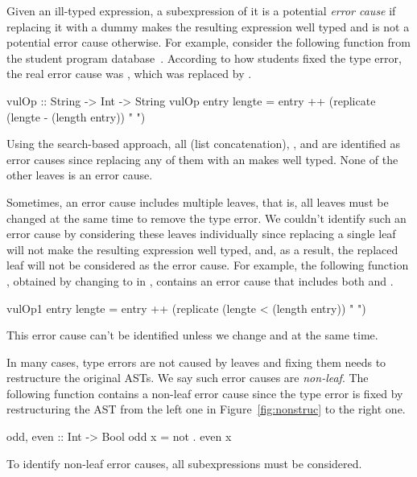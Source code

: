 \documentclass[12pt]{report}	%
\begin{document}
Given an ill-typed expression, a subexpression of
it is a potential \emph{error cause} if
replacing it with a dummy makes the resulting
expression well typed and is not a potential error
cause otherwise.
For example, consider the following function
 from the student program
database~\cite{Heliumbp}. According to how students fixed
the type error, the real error cause was ,
which was replaced by \progsq{ }.
%
\begin{program}
vulOp :: String -> Int -> String
vulOp entry lengte = entry ++ (replicate (lengte - (length entry)) " ")
\end{program}
%
%
%
Using the search-based approach, all \prog{(++)} (list concatenation),
, and  are identified as error causes since
replacing any of them with an  makes 
well typed. None of the other leaves is an error cause.

Sometimes, an error cause includes
multiple leaves, that is, all leaves must be changed at the
same time to remove the type error.
We couldn't identify such an error cause by
considering these leaves individually since replacing a single
leaf will not make the resulting expression well typed, and,
as a result, the replaced leaf will not be considered as
the error cause.
%
For example, the following function , obtained by changing
\prog{(-)} to \prog{(<)} in , contains an
error cause that includes both \prog{(<)} and .
%
%
\begin{program}
vulOp1 entry lengte = entry ++ (replicate (lengte < (length entry)) " ")
\end{program}
%
This error
cause can't be identified unless we change
\prog{(<)} and  at the same time.
%

In many cases, type errors are not caused by leaves and
fixing them needs to restructure the original ASTs.
We say such error causes are \emph{non-leaf}.
%
The following function  contains a non-leaf error cause
since the type error is fixed by restructuring the AST from the left one in
Figure~\ref{fig:nonstruc} to the right one.
%
\begin{program}
odd, even :: Int -> Bool
odd x = not . even x
\end{program}
%
To identify non-leaf error causes, all subexpressions must be
considered.
\end{document}
